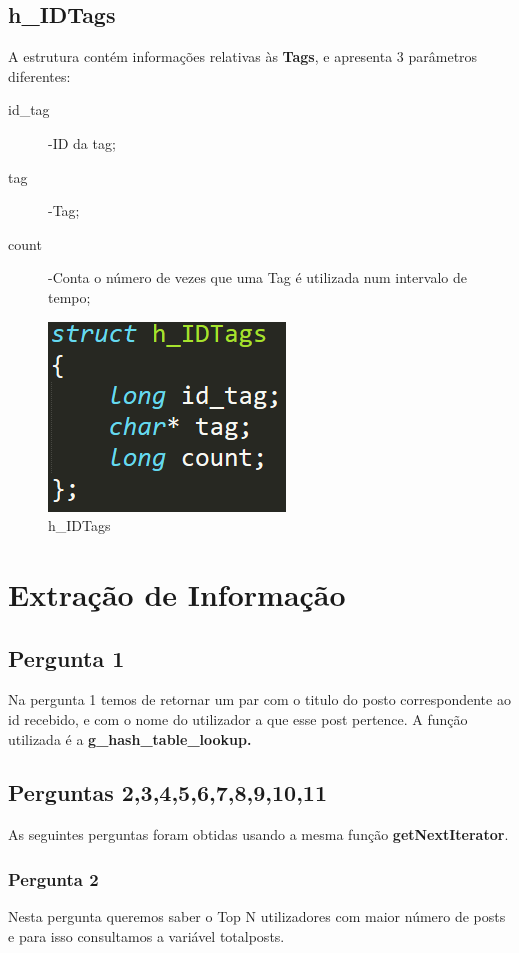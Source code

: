 \documentclass[a4paper]{article}
\begin{document}
	\subsection{h_IDTags}
	A estrutura contém informações relativas às \textbf{Tags}, e apresenta 3 parâmetros diferentes:

	\begin{description}
		\item[id_tag] -ID da tag;
		\item[tag] -Tag;
		\item[count] -Conta o número de vezes que uma Tag é utilizada num intervalo de tempo;
	\end{description}	


	\begin{figure}[ht]
	\centering
	\includegraphics[scale =0.25]{tags.png}
	\caption{h_IDTags}
	\label{img:h_IDTags}
	\end{figure}

	

\section {Extração de Informação}

	\subsection{Pergunta 1}
	Na pergunta 1 temos de retornar um par com o titulo do posto correspondente ao id recebido, e com o nome do utilizador a que esse post pertence. A função utilizada é a \textbf{g_hash_table_lookup.}

	\subsection{Perguntas 2,3,4,5,6,7,8,9,10,11}
	As seguintes perguntas foram obtidas usando a mesma função \textbf{getNextIterator}.

		\subsubsection{Pergunta 2}
			Nesta pergunta queremos saber o Top N utilizadores com maior número de posts e para isso consultamos a variável totalposts.
\end{document}
